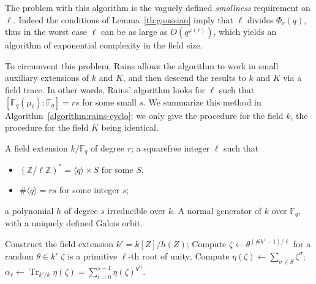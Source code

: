 \documentclass[12pt]{article}
\theoremstyle{plain}
\theoremstyle{definition}
\DeclareMathOperator{\trace}{Tr} %
\def\Z{\ensuremath{\mathbb{Z}}}
\def\F{\ensuremath{\mathbb{F}}}
\def\euler{\ensuremath{\varphi}}
\newcounter{algorithm}
\begin{document}
The problem with this algorithm is the vaguely defined
\emph{smallness} requirement on $\ell$. Indeed the conditions of
Lemma~\ref{th:gaussian} imply that $\ell$ divides $\Phi_r(q)$, thus in
the worst case $\ell$ can be as large as $O(q^{\euler(r)})$, which
yields an algorithm of exponential complexity in the field size.

To circumvent this problem, Rains allows the algorithm to work in
small auxiliary extensions of $k$ and $K$, and then descend the
results to $k$ and $K$ via a field trace. In other words, Rains'
algorithm looks for $\ell$ such that $[\F_q(\mu_\ell):\F_q]=rs$ for
some small $s$. We summarize this method in
Algorithm~\ref{algorithm:rains-cyclo}; we only give the procedure for
the field $k$, the procedure for the field $K$ being identical.

\begin{algorithm}
  \label{algorithm:rains-cyclo}
  \begin{algorithmic}[1]
    \REQUIRE A field extension $k/\F_q$ of degree $r$; a squarefree
    integer $\ell$ such that
    \begin{itemize}
    \item $(\Z/\ell\Z)^\ast = \langle q\rangle \times S$ for some $S$,
    \item $\#\langle q\rangle = rs$ for some integer $s$;
    \end{itemize}
    a polynomial $h$ of degree $s$ irreducible over $k$.
    \ENSURE A normal generator of $k$ over $\F_q$,
    with a uniquely defined Galois orbit.
    
    \STATE Construct the field extension $k'=k[Z]/h(Z)$;
    \REPEAT
    \STATE Compute $\zeta\leftarrow \theta^{(\#k'-1)/\ell}$ for a random $\theta\in k'$
    \UNTIL $\zeta$ is a primitive $\ell$-th root of unity;
    \STATE\label{algorithm:rains-cyclo:period} Compute $\eta(\zeta) \leftarrow \sum_{\sigma\in S}\zeta^\sigma$;
    \RETURN\label{algorithm:rains-cyclo:trace} $\alpha_r \leftarrow \trace_{k'/k}\eta(\zeta) = \sum_{i=0}^{s-1}\eta(\zeta)^{q^{ri}}$.
  \end{algorithmic}
\end{algorithm}
\end{document}
